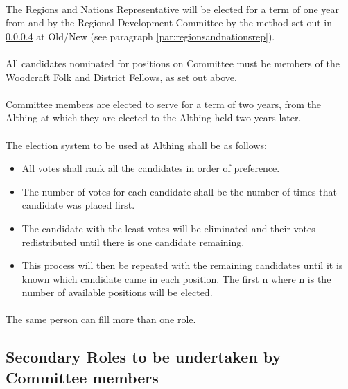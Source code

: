 \documentclass[a4paper, 12pt]{article}
\begin{document}
\paragraph{}
The Regions and Nations Representative will be elected for a term of one year from and by the Regional Development Committee by the method set out in \ref{sec:electionprocedure} at Old/New (see paragraph \ref{par:regionsandnationsrep}).

\paragraph{}
All candidates nominated for positions on Committee must be members of the Woodcraft Folk and District Fellows, as set out above.

\paragraph{}
Committee members are elected to serve for a term of two years, from the Althing at which they are elected to the Althing held two years later.

\paragraph{}
\label{sec:electionprocedure}
The election system to be used at Althing shall be as follows:
\begin{itemize}
\item All votes shall rank all the candidates in order of preference.
\item The number of votes for each candidate shall be the number of times that candidate was placed first.
\item The candidate with the least votes will be eliminated and their votes redistributed until there is one candidate remaining.
\item This process will then be repeated with the remaining candidates until it is known which candidate came in each position. The first n where n is the number of available positions will be elected.
\end{itemize}

\paragraph{}
\label{sec:moreroles}
The same person can fill more than one role.

\subsection{Secondary Roles to be undertaken by Committee members}
\label{sec:secondaryroles}
\end{document}
